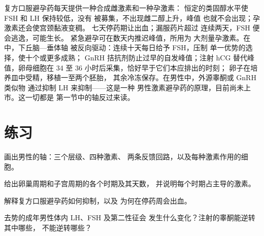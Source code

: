 \begin{proposition}[避孕与辅助生殖]\label{prop:b2:reproductive-hormones:clinic}
复方口服避孕药每天提供一种合成雌激素和一种孕激素：
恒定的类固醇水平使 FSH 和 LH 保持较低，没有
被募集，不出现雌二醇上升，峰值
也就不会出现；孕激素还会使宫颈黏液变稠。
七天停药期让出血；漏服药片超过
连续两天，FSH 便会逃逸，可能生长。
紧急避孕可在数天内推迟峰值，所用为
大剂量孕激素。在\emph{}中，下丘脑—垂体轴
被反向驱动：连续十天每日给予 FSH，压制
单一优势的选择，使十个或更多成熟；
GnRH 拮抗剂防止过早的自发峰值；注射
hCG 替代峰值，卵母细胞在 34
至 36 小时后采集，恰好早于它们本应排出的时刻；
卵子在培养皿中受精，移植一至两个胚胎，
其余冷冻保存。在男性中，外源睾酮或 GnRH 类似物
通过抑制 LH 来抑制——这是一种
男性激素避孕药的原理，目前尚未上市。这一切都是
第一节中的轴反过来读。
\end{proposition}

\section{练习}

\begin{exercise}[$\star$]\label{exo:b2:reproductive-hormones:1}
画出男性的轴：三个层级、四种激素、
两条反馈回路，以及每种激素作用的细胞。
\end{exercise}

\begin{exercise}[$\star$]\label{exo:b2:reproductive-hormones:2}
给出卵巢周期和子宫周期的各个时期及其天数，
并说明每个时期占主导的激素。
\end{exercise}

\begin{exercise}[$\star$]\label{exo:b2:reproductive-hormones:3}
解释复方口服避孕药如何抑制，以及
为何在停药周会出血。
\end{exercise}

\begin{exercise}[$\star$]\label{exo:b2:reproductive-hormones:4}
去势的成年男性体内 LH、FSH 及第二性征会
发生什么变化？注射的睾酮能逆转其中哪些，
不能逆转哪些？
\end{exercise}

